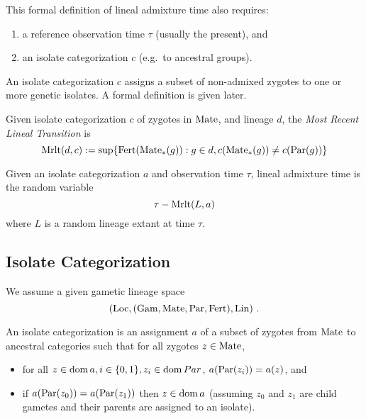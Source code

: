 This formal definition of lineal admixture time also requires:

\begin{enumerate}
\item
  a reference observation time \(\tau\) (usually the present), and
\item
  an isolate categorization \(c\) (e.g.~to ancestral groups).
\end{enumerate}

An isolate categorization \(c\) assigns a subset of non-admixed zygotes
to one or more genetic isolates. A formal definition is given later.

Given isolate categorization \(c\) of zygotes in \(\mathrm{Mate}\), and lineage
\(d\), the \emph{Most Recent Lineal Transition} is
$$
\mathrm{Mrlt}(d,c) := \sup\{ \mathrm{Fert}(\mathrm{Mate}_*(g)) : g \in d, c(\mathrm{Mate}_*(g)) \not= c(\mathrm{Par}(g)) \}
$$

Given an isolate categorization \(a\) and observation time \(\tau\),
lineal admixture time is the random variable
$$
\tau - \mathrm{Mrlt}(L, a)
$$
where $L$ is a random lineage extant at time $\tau$.


\subsection{Isolate Categorization}

We assume a given gametic lineage space
$$
(\mathrm{Loc}, (\mathrm{Gam}, \mathrm{Mate}, \mathrm{Par}, \mathrm{Fert}), \mathrm{Lin})
\text{ .}
$$

An isolate categorization is an assignment $a$ of a subset of zygotes
from $\mathrm{Mate}$ to ancestral categories such that for all zygotes
$z \in \mathrm{Mate}$,

\begin{itemize}
\item
  for all \(z \in \operatorname{dom}{ a}, i \in \{0, 1\}, z_i \in \operatorname{dom}{ Par}\),
  \(a(\mathrm{Par}(z_i)) = a(z)\), and
\item
  if \(a(\mathrm{Par}(z_0)) = a(\mathrm{Par}(z_1))\) then \(z \in \operatorname{dom}{ a}\) (assuming
  \(z_0\) and \(z_1\) are child gametes and their parents are assigned
  to an isolate).
\end{itemize}
